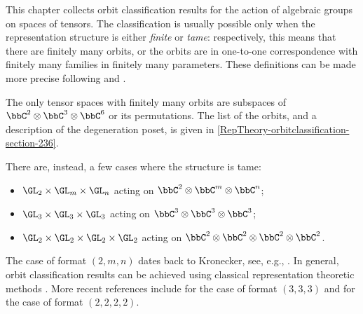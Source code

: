 This chapter collects orbit classification results for the action of algebraic groups on spaces of tensors. The classification is usually possible only when the representation structure is either \emph{finite} or \emph{tame}: respectively, this means that there are finitely many orbits, or the orbits are in one-to-one correspondence with finitely many families in finitely many parameters. These definitions can be made more precise following \cite{Vin79} and \cite{Gab72}.

The only tensor spaces with finitely many orbits are subspaces of $\bbC^2 \otimes \bbC^3 \otimes \bbC^6$ or its permutations. The list of the orbits, and a description of the degeneration poset, is given in \ref{RepTheory-orbitclassification-section-236}.

There are, instead, a few cases where the structure is tame:
\begin{itemize}
 \item $\GL_2 \times \GL_m \times \GL_n$ acting on $\bbC^2 \otimes \bbC^m \otimes \bbC^n$;
 \item $\GL_3 \times \GL_3 \times \GL_3$ acting on $\bbC^3 \otimes \bbC^3 \otimes \bbC^3$;
 \item $\GL_2 \times \GL_2 \times \GL_2 \times \GL_2$ acting on $\bbC^2 \otimes \bbC^2 \otimes \bbC^2 \otimes \bbC^2$.
\end{itemize}
The case of format $(2,m,n)$ dates back to Kronecker, see, e.g., \cite[Ch.XIII]{Gan59}. In general, orbit classification results can be achieved using classical representation theoretic methods \cite{Vin79}. More recent references include \cite{Nur00} for the case of format $(3,3,3)$ and \cite{CD12} for the case of format $(2,2,2,2)$.

% 

